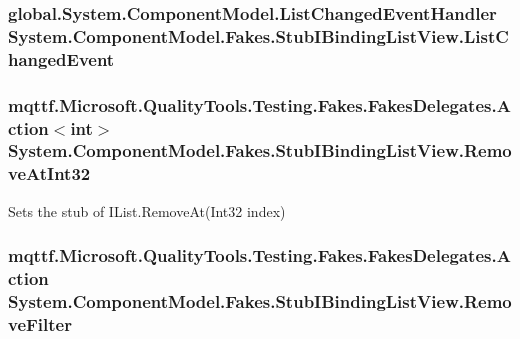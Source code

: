 \hypertarget{class_system_1_1_component_model_1_1_fakes_1_1_stub_i_binding_list_view_a7ee8f3f554ff887e97fa32b57b27bcc9}{
\subsubsection[{List\-Changed\-Event}]{\setlength{\rightskip}{0pt plus 5cm}global.\-System.\-Component\-Model.\-List\-Changed\-Event\-Handler System.\-Component\-Model.\-Fakes.\-Stub\-I\-Binding\-List\-View.\-List\-Changed\-Event}}\label{class_system_1_1_component_model_1_1_fakes_1_1_stub_i_binding_list_view_a7ee8f3f554ff887e97fa32b57b27bcc9}
\hypertarget{class_system_1_1_component_model_1_1_fakes_1_1_stub_i_binding_list_view_ad7afbb6ab5e2fe71e1f64dacaad54d56}{
\subsubsection[{Remove\-At\-Int32}]{\setlength{\rightskip}{0pt plus 5cm}mqttf.\-Microsoft.\-Quality\-Tools.\-Testing.\-Fakes.\-Fakes\-Delegates.\-Action$<$int$>$ System.\-Component\-Model.\-Fakes.\-Stub\-I\-Binding\-List\-View.\-Remove\-At\-Int32}}\label{class_system_1_1_component_model_1_1_fakes_1_1_stub_i_binding_list_view_ad7afbb6ab5e2fe71e1f64dacaad54d56}


Sets the stub of I\-List.\-Remove\-At(\-Int32 index)

\hypertarget{class_system_1_1_component_model_1_1_fakes_1_1_stub_i_binding_list_view_a6f71329b66aa65bb0831516f99db7de0}{
\subsubsection[{Remove\-Filter}]{\setlength{\rightskip}{0pt plus 5cm}mqttf.\-Microsoft.\-Quality\-Tools.\-Testing.\-Fakes.\-Fakes\-Delegates.\-Action System.\-Component\-Model.\-Fakes.\-Stub\-I\-Binding\-List\-View.\-Remove\-Filter}}\label{class_system_1_1_component_model_1_1_fakes_1_1_stub_i_binding_list_view_a6f71329b66aa65bb0831516f99db7de0}


